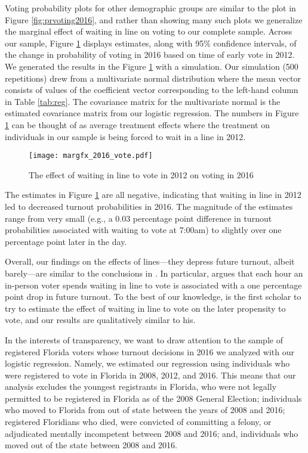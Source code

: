 \documentclass[12pt,titlepage]{article}
\begin{document}
Voting probability plots for other demographic groups are similar to
the plot in Figure \ref{fig:prvoting2016}, and rather than showing
many such plots we generalize the marginal effect of waiting in line
on voting to our complete sample.  Across our sample, Figure
\ref{fig:margfx2016} displays estimates, along with 95\% confidence
intervals, of the change in probability of voting in 2016 based on
time of early vote in 2012.  We generated the results in the Figure
\ref{fig:margfx2016} with a simulation.  Our simulation (500
repetitions) drew from a multivariate normal distribution where the
mean vector consists of values of the coefficient vector corresponding
to the left-hand column in Table \ref{tab:reg}.  The covariance matrix
for the multivariate normal is the estimated covariance matrix from
our logistic regression.  The numbers in Figure \ref{fig:margfx2016}
can be thought of as average treatment effects where the treatment on
individuals in our sample is being forced to wait in a line in 2012.

%

\begin{figure}[!ht]
\caption{The effect of waiting in line to vote in 2012 on voting in 2016}
  \label{fig:margfx2016}
  \centering
    \centering\texttt{[image: margfx\_2016\_vote.pdf]}
\end{figure}


The estimates in Figure \ref{fig:margfx2016} are all negative,
indicating that waiting in line in 2012 led to decreased turnout
probabilities in 2016.  The magnitude of the estimates range from very
small (e.g., a 0.03 percentage point difference in turnout
probabilities associated with waiting to vote at 7:00am) to slightly
over one percentage point later in the day.

Overall, our findings on the effects of lines---they depress future
turnout, albeit barely---are similar to the conclusions in
\citet{pettigrew:longlinesminorityprecincts}.  In particular,
\citeauthor{pettigrew:longlinesminorityprecincts} argues that each
hour an in-person voter spends waiting in line to vote is associated
with a one percentage point drop in future turnout.  To the best of
our knowledge, \citeauthor{pettigrew:longlinesminorityprecincts} is
the first scholar to try to estimate the effect of waiting in line to
vote on the later propensity to vote, and our results are
qualitatively similar to his.

In the interests of transparency, we want to draw attention to the
sample of registered Florida voters whose turnout decisions in 2016 we
analyzed with our logistic regression.  Namely, we estimated our
regression using individuals who were registered to vote in Florida in
2008, 2012, and 2016.  This means that our analysis excludes the
youngest registrants in Florida, who were not legally permitted to be
registered in Florida as of the 2008 General Election; individuals who
moved to Florida from out of state between the years of 2008 and 2016;
registered Floridians who died, were convicted of committing a felony,
or adjudicated mentally incompetent between 2008 and 2016; and,
individuals who moved out of the state between 2008 and 2016.
\end{document}
